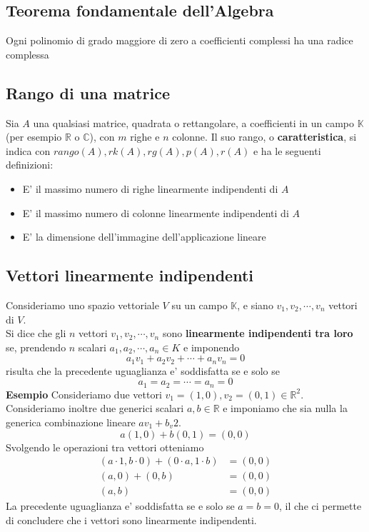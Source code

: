 \documentclass[a4paper, 10pt]{article}
\begin{document}
	\subsection{Teorema fondamentale dell'Algebra}
	Ogni polinomio di grado maggiore di zero a coefficienti complessi ha una radice complessa
	
	\subsection{Rango di una matrice}
	Sia $A$ una qualsiasi matrice, quadrata o rettangolare, a coefficienti in un campo $\mathbb{K}$ 
	(per esempio $\mathbb{R}$ o $\mathbb{C}$), con $m$ righe e $n$ colonne. Il suo rango, o \textbf{caratteristica}, 
	si indica con $rango(A), rk(A), rg(A), p(A), r(A)$ e ha le seguenti definizioni:
	\begin{itemize}
		\item E' il massimo numero di righe linearmente indipendenti di $A$
		\item E' il massimo numero di colonne linearmente indipendenti di $A$
		\item E' la dimensione dell'immagine dell'applicazione lineare
	\end{itemize}
	
	\subsection{Vettori linearmente indipendenti}
	Consideriamo uno spazio vettoriale $V$ su un campo $\mathbb{K}$, e siano $v_1, v_2, \cdots, v_{n}$ vettori di $V$.\\
	Si dice che gli $n$ vettori $v_1, v_2, \cdots, v_{n}$ sono \textbf{linearmente indipendenti tra loro} se, 
	prendendo $n$ scalari $a_{1}, a_{2} , \cdots, a_{n} \in K$ e imponendo 
	\[ a_1 v_1 + a_2 v_2 + \cdots + a_n v_n = 0 \]
	risulta che la precedente uguaglianza e' soddisfatta se e solo se 
	\[ a_1 = a_2 = \cdots = a_{n} = 0 \]
	\textbf{Esempio}
	Consideriamo due vettori $v_{1} = (1,0) , v_{2} = (0,1) \in \mathbb{R} ^{2}$. \\
	Consideriamo inoltre due generici scalari $a,b \in \mathbb{R}$ e imponiamo che sia nulla
	 la generica combinazione lineare $av_1 + b_v2$.
	\[ a(1,0) + b(0,1) = (0,0) \]
	Svolgendo le operazioni tra vettori otteniamo
	\begin{equation*}
		\begin{split}
			(a\cdot 1 , b \cdot 0) + (0 \cdot a, 1 \cdot b) &= (0,0) \\
			(a,0) + (0,b) &= (0,0) 	\\
			(a,b) &= (0,0) 
		\end{split}
	\end{equation*}	 
	La precedente uguaglianza e' soddisfatta se e solo se $a = b = 0$, il che ci permette di 
	concludere che i vettori sono linearmente indipendenti.
	
\end{document}
